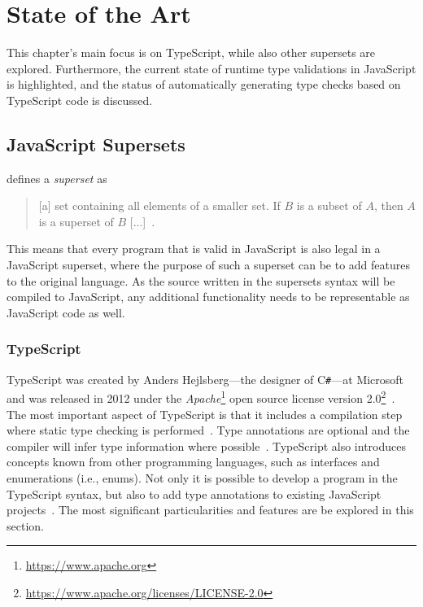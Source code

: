 \chapter{State of the Art}
\label{cha:state-of-the-art}

This chapter's main focus is on TypeScript, while also other supersets are explored. Furthermore, the current state of runtime type validations in JavaScript is highlighted, and the status of automatically generating type checks based on TypeScript code is discussed.

\section{JavaScript Supersets}
\label{sec:supersets}

\citeauthor{Term:Superset} defines a \emph{superset} as 
\begin{quote}
   [a] set containing all elements of a smaller set. If $B$ is a subset of $A$, then $A$ is a superset of $B$ [...]~\cite{Term:Superset}.
\end{quote}
This means that every program that is valid in JavaScript is also legal in a JavaScript superset, where the purpose of such a superset can be to add features to the original language. As the source written in the supersets syntax will be compiled to JavaScript, any additional functionality needs to be representable as JavaScript code as well.

\subsection{TypeScript}
\label{sec:typescript}

TypeScript was created by Anders Hejlsberg---the designer of C\texttt{\#}---at Microsoft~\cite[p.~10]{MasteringTypeScript:Rozentals:2017} and was released in 2012 under the \emph{Apache}\footnote{\url{https://www.apache.org}} open source license version 2.0\footnote{\url{https://www.apache.org/licenses/LICENSE-2.0}}~\cite[p.~xix]{ProTypeScript:Fenton:2014}. The most important aspect of TypeScript is that it includes a compilation step where static type checking is performed~\cite[p.~11]{MasteringTypeScript:Rozentals:2017}. Type annotations are optional and the compiler will infer type information where possible~\cite[p.~10]{TypeScriptBook:Syed:2017}. TypeScript also introduces concepts known from other programming languages, such as interfaces and enumerations (i.e., enums). Not only it is possible to develop a program in the TypeScript syntax, but also to add type annotations to existing JavaScript projects~\cite[p.~13]{MasteringTypeScript:Rozentals:2017}. The most significant particularities and features are be explored in this section.

